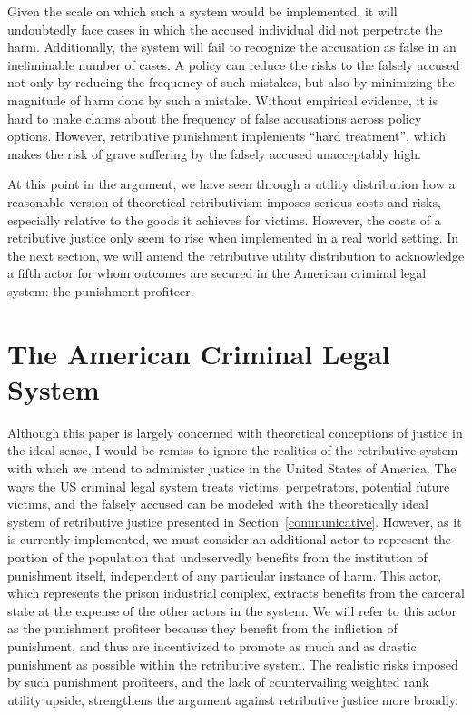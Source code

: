 \documentclass{article}
\begin{document}
        Given the scale on which such a system would be implemented, it will undoubtedly face cases in which the accused individual did not perpetrate the harm. Additionally, the system will fail to recognize the accusation as false in an ineliminable number of cases. A policy can reduce the risks to the falsely accused not only by reducing the frequency of such mistakes, but also by minimizing the magnitude of harm done by such a mistake. Without empirical evidence, it is hard to make claims about the frequency of false accusations across policy options. However, retributive punishment implements ``hard treatment'', which makes the risk of grave suffering by the falsely accused unacceptably high. 

        At this point in the argument, we have seen through a utility distribution how a reasonable version of theoretical retributivism imposes serious costs and risks, especially relative to the goods it achieves for victims. However, the costs of a retributive justice only seem to rise when implemented in a real world setting. In the next section, we will amend the retributive utility distribution to acknowledge a fifth actor for whom outcomes are secured in the American criminal legal system: the punishment profiteer. 


    \section{The American Criminal Legal System}
        \label{criminal-legal-system}

        Although this paper is largely concerned with theoretical conceptions of justice in the ideal sense, I would be remiss to ignore the realities of the retributive system with which we intend to administer justice in the United States of America. The ways the US criminal legal system treats victims, perpetrators, potential future victims, and the falsely accused can be modeled with the theoretically ideal system of retributive justice presented in Section~\ref{communicative}. However, as it is currently implemented, we must consider an additional actor to represent the portion of the population that undeservedly benefits from the institution of punishment itself, independent of any particular instance of harm. This actor, which represents the prison industrial complex, extracts benefits from the carceral state at the expense of the other actors in the system. We will refer to this actor as the punishment profiteer because they benefit from the infliction of punishment, and thus are incentivized to promote as much and as drastic punishment as possible within the retributive system. The realistic risks imposed by such punishment profiteers, and the lack of countervailing weighted rank utility upside, strengthens the argument against retributive justice more broadly. 
\end{document}

